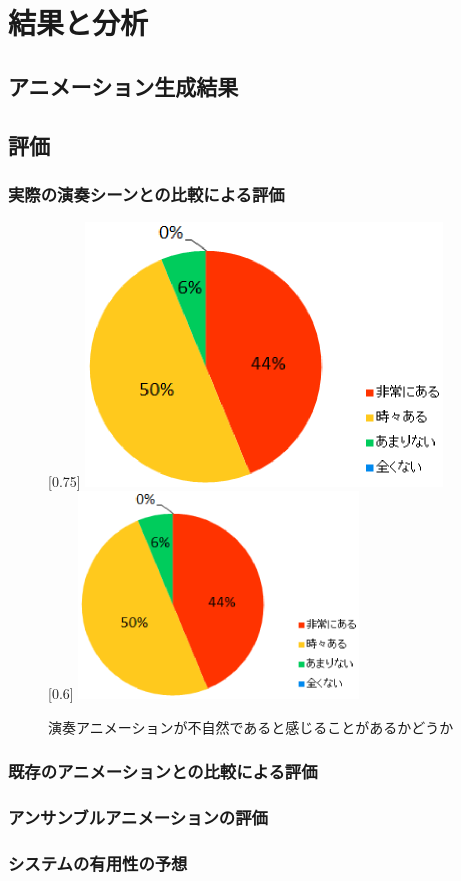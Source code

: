 \chapter{結果と分析}
\label{chap:results}

\section{アニメーション生成結果}

\section{評価}

\subsection{実際の演奏シーンとの比較による評価}

\begin{figure}[t]
	\centering
	[0.75\linewidth]{
		\includegraphics[height=7cm]{fig/chap1/Q1-1.eps}}
	[0.6\linewidth]{
		\includegraphics[height=5.5cm]{fig/chap1/Q1-2.eps}}
	\caption{演奏アニメーションが不自然であると感じることがあるかどうか}
	\label{fig:model}
\end{figure}

\subsection{既存のアニメーションとの比較による評価}

\subsection{アンサンブルアニメーションの評価}

\subsection{システムの有用性の予想}
